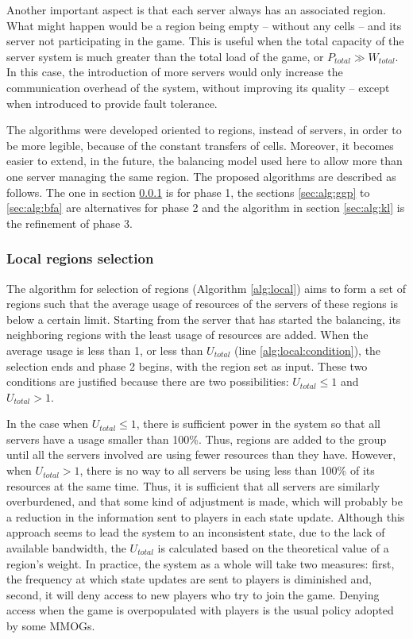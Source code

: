 Another important aspect is that each server always has an associated region. What might happen would be a region being empty -- without any cells -- and its server not participating in the game. This is useful when the total capacity of the server system is much greater than the total load of the game, or $ P_{total} \gg W_{total}$. In this case, the introduction of more servers would only increase the communication overhead of the system, without improving its quality -- except when introduced to provide fault tolerance.

The algorithms were developed oriented to regions, instead of servers, in order to be more legible, because of the constant transfers of cells. Moreover, it becomes easier to extend, in the future, the balancing model used here to allow more than one server managing the same region. The proposed algorithms are described as follows. The one in section \ref{sec:alg:localselect} is for phase 1, the sections \ref{sec:alg:ggp} to \ref{sec:alg:bfa} are alternatives for phase 2 and the algorithm in section \ref{sec:alg:kl} is the refinement of phase 3.

\subsubsection{Local regions selection}
\label{sec:alg:localselect}

The algorithm for selection of regions (Algorithm \ref{alg:local}) aims to form a set of regions such that the average usage of resources of the servers of these regions is below a certain limit. Starting from the server that has started the balancing, its neighboring regions with the least usage of resources are added. When the average usage is less than 1, or less than $ U_{total}$ (line \ref{alg:local:condition}), the selection ends and phase 2 begins, with the region set as input. These two conditions are justified because there are two possibilities: $U_{total} \leq 1$ and $U_{total} > 1$.
	
In the case when $U_{total} \leq 1$, there is sufficient power in the system so that all servers have a usage smaller than 100\%. Thus, regions are added to the group until all the servers involved are using fewer resources than they have. However, when $U_{total} > 1$, there is no way to all servers be using less than 100\% of its resources at the same time. Thus, it is sufficient that all servers are similarly overburdened, and that some kind of adjustment is made, which will probably be a reduction in the information sent to players in each state update. Although this approach seems to lead the system to an inconsistent state, due to the lack of available bandwidth, the $U_{total}$ is calculated based on the theoretical value of a region's weight. In practice, the system as a whole will take two measures: first, the frequency at which state updates are sent to players is diminished and, second, it will deny access to new players who try to join the game. Denying access when the game is overpopulated with players is the usual policy adopted by some MMOGs.


